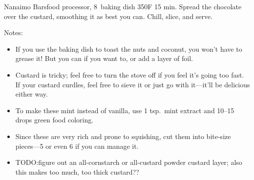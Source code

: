 \begin{recipe}{Nanaimo Bars}{food processor, 8\inch{}\inch\ baking dish \hfill 350\0F \hfill 15 min.}
 \newstep Spread the chocolate over the custard, smoothing it as best you can. Chill, slice, and serve.

 \freeform Notes:
 \begin{itemize}
  \item  If you use the baking dish to toast the nuts and coconut, you won't have to grease it! But you can if you want to, or add a layer of foil.
  \item Custard is tricky; feel free to turn the stove off if you feel it's going too fast. If your custard curdles, feel free to sieve it or just go with it---it'll be delicious either way.
  \item To make these mint instead of vanilla, use 1 tsp.\ mint extract and 10--15 drops green food coloring.
  \item Since these are very rich and prone to squishing, cut them into bite-size pieces---5 or even 6 if you can manage it.
  \item TODO:\@ figure out an all-cornstarch or all-custard powder custard layer; also this makes too much, too thick custard??
 \end{itemize}
\end{recipe}
